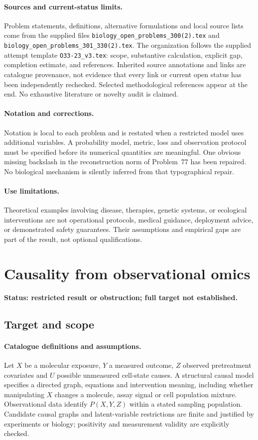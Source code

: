 \documentclass[11pt]{article}
\begin{document}
\paragraph{Sources and current-status limits.}
Problem statements, definitions, alternative formulations and local source lists
come from the supplied files
\texttt{biology\_open\_problems\_300(2).tex} and
\texttt{biology\_open\_problems\_301\_330(2).tex}.
The organization follows the supplied attempt template
\texttt{O33-23\_v3.tex}: scope, substantive calculation, explicit gap,
completion estimate, and references. Inherited source annotations and links are
catalogue provenance, not evidence that every link or current open status has
been independently rechecked. Selected methodological references appear at the
end. No exhaustive literature or novelty audit is claimed.

\paragraph{Notation and corrections.}
Notation is local to each problem and is restated when a restricted model uses
additional variables. A probability model, metric, loss and observation protocol
must be specified before its numerical quantities are meaningful. One obvious
missing backslash in the reconstruction norm of Problem~77 has been repaired.
No biological mechanism is silently inferred from that typographical repair.

\paragraph{Use limitations.}
Theoretical examples involving disease, therapies, genetic systems, or ecological
interventions are not operational protocols, medical guidance, deployment advice,
or demonstrated safety guarantees. Their assumptions and empirical gaps are part
of the result, not optional qualifications.


\section*{Causality from observational omics}
\label{prob:047}
\noindent\textbf{Status: restricted result or obstruction; full target not established.}
\subsection{Target and scope}
\paragraph{Catalogue definitions and assumptions.}
Let $X$ be a molecular exposure, $Y$ a measured outcome, $Z$ observed pretreatment covariates and $U$ possible unmeasured cell-state causes. A structural causal model specifies a directed graph, equations and intervention meaning, including whether manipulating $X$ changes a molecule, assay signal or cell population mixture. Observational data identify $P(X,Y,Z)$ within a stated sampling population. Candidate causal graphs and latent-variable restrictions are finite and justified by experiments or biology; positivity and measurement validity are explicitly checked.
\end{document}
